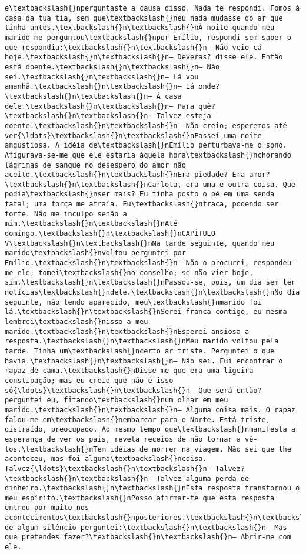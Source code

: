 \begin{Verbatim}[commandchars=\\\{\}]
e\textbackslash{}nperguntaste a causa disso. Nada te respondi. Fomos à casa da tua tia, sem que\textbackslash{}neu nada mudasse do ar que tinha antes.\textbackslash{}n\textbackslash{}nÀ noite quando meu marido me perguntou\textbackslash{}npor Emílio, respondi sem saber o que respondia:\textbackslash{}n\textbackslash{}n— Não veio cá hoje.\textbackslash{}n\textbackslash{}n— Deveras? disse ele. Então está doente.\textbackslash{}n\textbackslash{}n— Não sei.\textbackslash{}n\textbackslash{}n— Lá vou amanhã.\textbackslash{}n\textbackslash{}n— Lá onde?\textbackslash{}n\textbackslash{}n— À casa dele.\textbackslash{}n\textbackslash{}n— Para quê?\textbackslash{}n\textbackslash{}n— Talvez esteja doente.\textbackslash{}n\textbackslash{}n— Não creio; esperemos até ver{\ldots}\textbackslash{}n\textbackslash{}nPassei uma noite angustiosa. A idéia de\textbackslash{}nEmílio perturbava-me o sono. Afigurava-se-me que ele estaria àquela hora\textbackslash{}nchorando lágrimas de sangue no desespero do amor não aceito.\textbackslash{}n\textbackslash{}nEra piedade? Era amor?\textbackslash{}n\textbackslash{}nCarlota, era uma e outra coisa. Que podia\textbackslash{}nser mais? Eu tinha posto o pé em uma senda fatal; uma força me atraía. Eu\textbackslash{}nfraca, podendo ser forte. Não me inculpo senão a mim.\textbackslash{}n\textbackslash{}nAté domingo.\textbackslash{}n\textbackslash{}nCAPÍTULO V\textbackslash{}n\textbackslash{}nNa tarde seguinte, quando meu marido\textbackslash{}nvoltou perguntei por Emílio.\textbackslash{}n\textbackslash{}n— Não o procurei, respondeu-me ele; tomei\textbackslash{}no conselho; se não vier hoje, sim.\textbackslash{}n\textbackslash{}nPassou-se, pois, um dia sem ter notícias\textbackslash{}ndele.\textbackslash{}n\textbackslash{}nNo dia seguinte, não tendo aparecido, meu\textbackslash{}nmarido foi lá.\textbackslash{}n\textbackslash{}nSerei franca contigo, eu mesma lembrei\textbackslash{}nisso a meu marido.\textbackslash{}n\textbackslash{}nEsperei ansiosa a resposta.\textbackslash{}n\textbackslash{}nMeu marido voltou pela tarde. Tinha um\textbackslash{}ncerto ar triste. Perguntei o que havia.\textbackslash{}n\textbackslash{}n— Não sei. Fui encontrar o rapaz de cama.\textbackslash{}nDisse-me que era uma ligeira constipação; mas eu creio que não é isso só{\ldots}\textbackslash{}n\textbackslash{}n— Que será então? perguntei eu, fitando\textbackslash{}num olhar em meu marido.\textbackslash{}n\textbackslash{}n— Alguma coisa mais. O rapaz falou-me em\textbackslash{}nembarcar para o Norte. Está triste, distraído, preocupado. Ao mesmo tempo que\textbackslash{}nmanifesta a esperança de ver os pais, revela receios de não tornar a vê-los.\textbackslash{}nTem idéias de morrer na viagem. Não sei que lhe aconteceu, mas foi alguma\textbackslash{}ncoisa. Talvez{\ldots}\textbackslash{}n\textbackslash{}n— Talvez?\textbackslash{}n\textbackslash{}n— Talvez alguma perda de dinheiro.\textbackslash{}n\textbackslash{}nEsta resposta transtornou o meu espírito.\textbackslash{}nPosso afirmar-te que esta resposta entrou por muito nos acontecimentos\textbackslash{}nposteriores.\textbackslash{}n\textbackslash{}nDepois de algum silêncio perguntei:\textbackslash{}n\textbackslash{}n— Mas que pretendes fazer?\textbackslash{}n\textbackslash{}n— Abrir-me com ele. 
\end{Verbatim}
